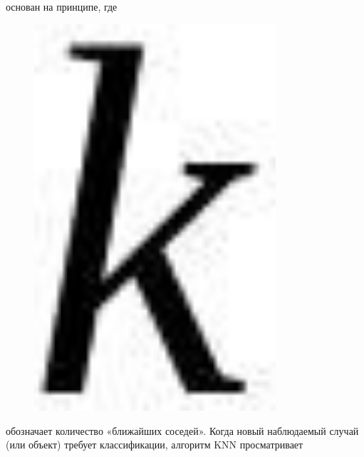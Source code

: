основан на принципе, где \begin{figure}[H]
	\centering
	\includegraphics[width=0.8\textwidth]{assets/93}
	\caption*{}
\end{figure} обозначает
количество «ближайших соседей». Когда новый наблюдаемый случай (или
объект) требует классификации, алгоритм KNN просматривает
